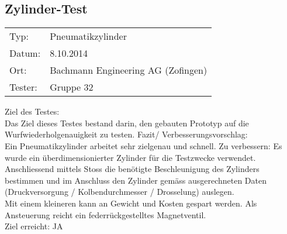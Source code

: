\subsection{Zylinder-Test}
\begin{tabular}{p{2cm}p{2cm}}
	Typ: & Pneumatikzylinder \\
	Datum: & 8.10.2014     \\
	Ort: & Bachmann Engineering AG (Zofingen)   \\
	Tester: & Gruppe 32     \\
	
\end{tabular}



Ziel des Testes:   \\
Das Ziel dieses Testes bestand darin, den gebauten Prototyp auf die 
Wurfwiederholgenauigkeit zu testen. 
Fazit/ Verbesserungsvorschlag: \\
Ein Pneumatikzylinder arbeitet sehr zielgenau und schnell. 
Zu verbessern: 
Es wurde ein überdimensionierter Zylinder für die Testzwecke verwendet.  \\

Anschliessend mittels Stoss die benötigte Beschleunigung des Zylinders 
bestimmen und im Anschluss den Zylinder gemäss ausgerechneten Daten 
(Druckversorgung / Kolbendurchmesser / Drosselung) auslegen. \\

Mit einem kleineren kann an Gewicht und Kosten gespart werden. Als 
Ansteuerung reicht ein federrückgestelltes Magnetventil.  \\
Ziel erreicht:   JA